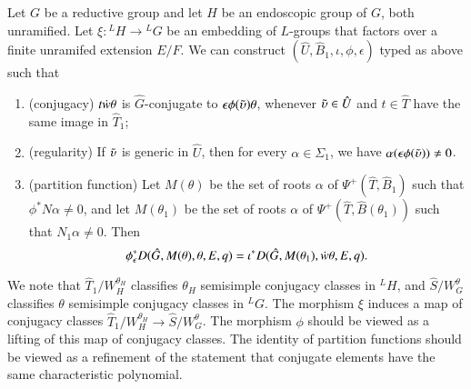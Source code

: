 \begin{proposition}\label{lemma:ephi}
  Let $G$ be a reductive group and let $H$ be an endoscopic group of
  $G$, both unramified.  Let $\xi:{}^LH\to {}^LG$ be an embedding of
  $L$-groups that factors over a finite unramifed extension $E/F$.
  We can construct $(\hat U,\hat B_1,\iota,\phi,\epsilon)$ typed as above
  such that
\begin{enumerate}
\item (conjugacy) $t\dot w\theta$ is $\hat G$-conjugate to
  $\epsilon\phi(\tilde\upsilon) \theta$, whenever $\tilde\upsilon\in \hat U$ and $t\in \hat
  T$ have the same image in $\hat T_1$;
\item (regularity) If $\tilde\upsilon$ is generic in $\hat U$, then for every
  $\alpha\in\Sigma_1$, we have $\alpha(\epsilon\phi(\tilde\upsilon))\ne 0$.
\item (partition function) Let $M(\theta)$ be the set of roots $\alpha$ of
  $\Psi^+(\hat T,\hat B_1)$ such that $\phi^*N\alpha\ne 0$, and let
  $M(\theta_1)$ be the set of roots $\alpha$ of $\Psi^+(\hat T,\hat B(\theta_1))$ such
  that $N_1\alpha\ne0$.  Then
\begin{equation}
\phi^*_\epsilon D(\hat G,M(\theta),\theta,E,q) =\iota^* D(\hat G,M(\theta_1),\dot w\theta,E,q).
\end{equation}
\end{enumerate}
\end{proposition}

We note that $\hat T_1/W_H^{\theta_H}$ classifies $\theta_H$
semisimple conjugacy classes in ${}^LH$, and $\hat S/W_G^{\theta}$
classifies $\theta$ semisimple conjugacy classes in ${}^LG$.  The
morphism $\xi$ induces a map of conjugacy classes $\hat
T_1/W_H^{\theta_H}\to \hat S/W_G^\theta$.  The morphism $\phi$ should
be viewed as a lifting of this map of conjugacy classes.
The identity of partition functions should be viewed as a refinement of
the statement that conjugate elements have the same characteristic polynomial.


